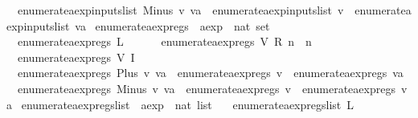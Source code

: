 \begin{isabellebody}
\ \ {\isachardoublequoteopen}enumerate{\isacharunderscore}aexp{\isacharunderscore}inputs{\isacharunderscore}list\ {\isacharparenleft}Minus\ v\ va{\isacharparenright}\ {\isacharequal}\ enumerate{\isacharunderscore}aexp{\isacharunderscore}inputs{\isacharunderscore}list\ v\ {\isacharat}\ enumerate{\isacharunderscore}aexp{\isacharunderscore}inputs{\isacharunderscore}list\ va{\isachardoublequoteclose}\isanewline
\isanewline
{}\isamarkupfalse%
\ enumerate{\isacharunderscore}aexp{\isacharunderscore}regs\ {\isacharcolon}{\isacharcolon}\ {\isachardoublequoteopen}aexp\ {\isasymRightarrow}\ nat\ set{\isachardoublequoteclose}\ \isanewline
\ \ {\isachardoublequoteopen}enumerate{\isacharunderscore}aexp{\isacharunderscore}regs\ {\isacharparenleft}L\ {\isacharunderscore}{\isacharparenright}\ {\isacharequal}\ {\isacharbraceleft}{\isacharbraceright}{\isachardoublequoteclose}\ {\isacharbar}\isanewline
\ \ {\isachardoublequoteopen}enumerate{\isacharunderscore}aexp{\isacharunderscore}regs\ {\isacharparenleft}V\ {\isacharparenleft}R\ n{\isacharparenright}{\isacharparenright}\ {\isacharequal}\ {\isacharbraceleft}n{\isacharbraceright}{\isachardoublequoteclose}\ {\isacharbar}\isanewline
\ \ {\isachardoublequoteopen}enumerate{\isacharunderscore}aexp{\isacharunderscore}regs\ {\isacharparenleft}V\ {\isacharparenleft}I\ {\isacharunderscore}{\isacharparenright}{\isacharparenright}\ {\isacharequal}\ {\isacharbraceleft}{\isacharbraceright}{\isachardoublequoteclose}\ {\isacharbar}\isanewline
\ \ {\isachardoublequoteopen}enumerate{\isacharunderscore}aexp{\isacharunderscore}regs\ {\isacharparenleft}Plus\ v\ va{\isacharparenright}\ {\isacharequal}\ enumerate{\isacharunderscore}aexp{\isacharunderscore}regs\ v\ {\isasymunion}\ enumerate{\isacharunderscore}aexp{\isacharunderscore}regs\ va{\isachardoublequoteclose}\ {\isacharbar}\isanewline
\ \ {\isachardoublequoteopen}enumerate{\isacharunderscore}aexp{\isacharunderscore}regs\ {\isacharparenleft}Minus\ v\ va{\isacharparenright}\ {\isacharequal}\ enumerate{\isacharunderscore}aexp{\isacharunderscore}regs\ v\ {\isasymunion}\ enumerate{\isacharunderscore}aexp{\isacharunderscore}regs\ va{\isachardoublequoteclose}\isanewline
\isanewline
{}\isamarkupfalse%
\ enumerate{\isacharunderscore}aexp{\isacharunderscore}regs{\isacharunderscore}list\ {\isacharcolon}{\isacharcolon}\ {\isachardoublequoteopen}aexp\ {\isasymRightarrow}\ nat\ list{\isachardoublequoteclose}\ \isanewline
\ \ {\isachardoublequoteopen}enumerate{\isacharunderscore}aexp{\isacharunderscore}regs{\isacharunderscore}list\ {\isacharparenleft}L\ {\isacharunderscore}{\isacharparenright}\ {\isacharequal}\ {\isacharbrackleft}{\isacharbrackright}{\isachardoublequoteclose}\ {\isacharbar}\isanewline

\end{isabellebody}
